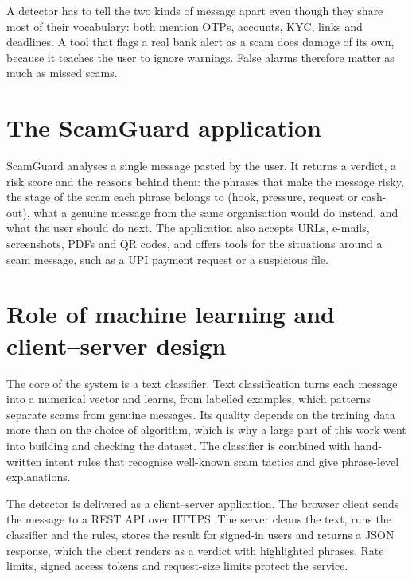 \documentclass[12pt,a4paper]{report}
\begin{document}
A detector has to tell the two kinds of message apart even though they share most of their vocabulary: both mention OTPs, accounts, KYC, links and deadlines. A tool that flags a real bank alert as a scam does damage of its own, because it teaches the user to ignore warnings. False alarms therefore matter as much as missed scams.

\section{The ScamGuard application}
ScamGuard analyses a single message pasted by the user. It returns a verdict, a risk score and the reasons behind them: the phrases that make the message risky, the stage of the scam each phrase belongs to (hook, pressure, request or cash-out), what a genuine message from the same organisation would do instead, and what the user should do next. The application also accepts URLs, e-mails, screenshots, PDFs and QR codes, and offers tools for the situations around a scam message, such as a UPI payment request or a suspicious file.

\section{Role of machine learning and client--server design}
The core of the system is a text classifier. Text classification turns each message into a numerical vector and learns, from labelled examples, which patterns separate scams from genuine messages. Its quality depends on the training data more than on the choice of algorithm, which is why a large part of this work went into building and checking the dataset. The classifier is combined with hand-written intent rules that recognise well-known scam tactics and give phrase-level explanations.

The detector is delivered as a client--server application. The browser client sends the message to a REST API over HTTPS. The server cleans the text, runs the classifier and the rules, stores the result for signed-in users and returns a JSON response, which the client renders as a verdict with highlighted phrases. Rate limits, signed access tokens and request-size limits protect the service.
\end{document}
